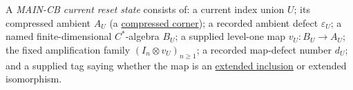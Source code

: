 \hypertarget{def:maincb-reset-state}{}%
\begin{definition}\label{def:maincb-reset-state}
A \emph{MAIN-CB current reset state} consists of: a
current index union $U$; its compressed ambient $A_U$ (a
\hyperref[def:compressed-corner]{compressed corner}); a recorded ambient defect
$\varepsilon_U$; a named finite-dimensional $C^*$-algebra $B_U$; a supplied
level-one map $v_U:B_U\to A_U$; the fixed amplification family
$(I_n\otimes v_U)_{n\ge1}$; a recorded map-defect number $d_U$; and a
supplied tag saying whether the map is an
\hyperref[def:extended-delta-inclusion]{extended inclusion} or extended isomorphism.
\end{definition}

